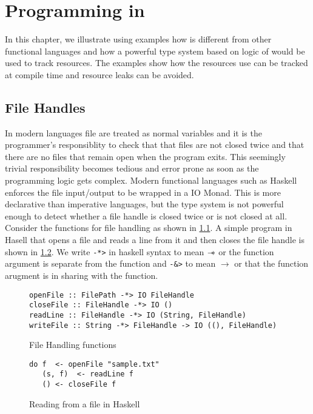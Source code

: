 \chapter{Programming in \qub{}}
In this chapter, we illustrate using examples how \qub{} is different
from other functional languages and how a powerful type system based on logic of \BI
would be used to track resources. The examples show how the resources use
can be tracked at compile time and resource leaks can be avoided.

\section{File Handles}\label{sec:file-handle-example}
In modern languages file are treated as normal variables
and it is the programmer's responsiblity to check that that files are not closed twice
and that there are no files that remain open when the program exits. This seemingly trivial
responsibility becomes tedious and error prone as soon as the programming logic gets complex.
Modern functional languages such as Haskell enforces the file input/output to be wrapped in a IO Monad.
This is more declarative than imperative languages, but the type system is not powerful enough
to detect whether a file handle is closed twice or is not closed at all.
Consider the functions for file handling as shown in \cref{fig:file-handling-function}. A simple program in Hasell that opens a file and reads
a line from it and then closes the file handle is shown in \cref{fig:file-read-close}.
We write \texttt{-*>} in haskell syntax to mean $\mathrel{-\mkern-6mu*}$ or the function argument is separate from
the function and \texttt{-&>} to mean $\rightarrow$ or that the function arugment is in sharing
with the function.

\begin{figure}[h]
  \begin{framed}
    \begin{verbatim}
openFile :: FilePath -*> IO FileHandle
closeFile :: FileHandle -*> IO ()
readLine :: FileHandle -*> IO (String, FileHandle)
writeFile :: String -*> FileHandle -> IO ((), FileHandle)
    \end{verbatim}
  \end{framed}
  \caption{File Handling functions}
  \label{fig:file-handling-function}
\end{figure}

\begin{figure}[h]
  \begin{framed}
    \begin{verbatim}
do f  <- openFile "sample.txt"
   (s, f)  <- readLine f
   () <- closeFile f
    \end{verbatim}
  \end{framed}
  \caption{Reading from a file in Haskell}
  \label{fig:file-read-close}
\end{figure}

